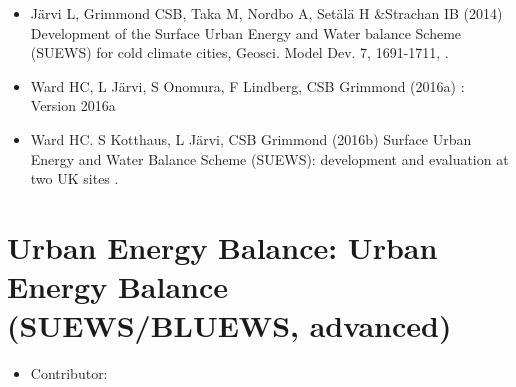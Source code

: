 \documentclass[letterpaper,10pt,english]{sphinxmanual}
\begin{document}
\begin{itemize}
\begin{description}
\begin{itemize}
\item {} 
Järvi L, Grimmond CSB, Taka M, Nordbo A, Setälä H \&Strachan IB (2014) Development of the Surface Urban Energy and Water balance Scheme (SUEWS) for cold climate cities, Geosci. Model Dev. 7, 1691-1711, .                                                                                                                                                                                                                                                                        \textbar{}

\item {} 
Ward HC, L Järvi, S Onomura, F Lindberg, CSB Grimmond (2016a) : Version 2016a

\item {} 
Ward HC. S Kotthaus, L Järvi, CSB Grimmond (2016b) Surface Urban Energy and Water Balance Scheme (SUEWS): development and evaluation at two UK sites .

\end{itemize}

\end{description}

\end{itemize}


\section{Urban Energy Balance: Urban Energy Balance (SUEWS/BLUEWS, advanced)}
\label{\detokenize{processor/Urban Energy Balance Urban Energy Balance (SUEWS.BLUEWS, advanced):urban-energy-balance-urban-energy-balance-suews-bluews-advanced}}\label{\detokenize{processor/Urban Energy Balance Urban Energy Balance (SUEWS.BLUEWS, advanced):suewsadvanced}}\label{\detokenize{processor/Urban Energy Balance Urban Energy Balance (SUEWS.BLUEWS, advanced)::doc}}\begin{itemize}
\item {} 
Contributor:

\end{itemize}
\end{document}
